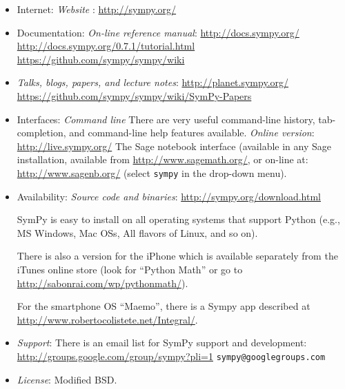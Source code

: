 \documentclass[12pt]{article}
\begin{document}
\begin{itemize}
\item
Internet:
\newline
{\it Website} :
\newline
\url{http://sympy.org/}


\item
Documentation:
\newline
{\it On-line reference manual}: 
\newline
\url{http://docs.sympy.org/}
\newline
\url{http://docs.sympy.org/0.7.1/tutorial.html}
\newline
\url{https://github.com/sympy/sympy/wiki}

\item
{\it Talks, blogs, papers, and lecture notes}:
\newline
\url{http://planet.sympy.org/}
\newline
\url{https://github.com/sympy/sympy/wiki/SymPy-Papers}

\item
Interfaces:
\newline
{\it Command line}
\newline
There are very useful command-line history, tab-completion, and
command-line help features available.
\newline
{\it Online version}:
\newline
\url{http://live.sympy.org/}
\newline
The Sage notebook interface (available in any Sage installation,
available from \url{http://www.sagemath.org/}, or on-line at:
\url{http://www.sagenb.org/} (select {\tt sympy} in the drop-down menu).
\item
Availability:
\newline
{\it Source code and binaries}:
\url{http://sympy.org/download.html}

SymPy is easy to install on all operating systems that 
support Python (e.g., MS Windows, Mac OSs, All flavors of Linux, and
so on).

There is also a version for the iPhone which is available separately
from the iTunes online store (look for ``Python Math'' or
go to \url{http://sabonrai.com/wp/pythonmath/}).

For the smartphone OS ``Maemo'', there is a Sympy app described at
\url{http://www.robertocolistete.net/Integral/}.


\item
{\it Support}:
\newline
There is an email list for SymPy support and development:
\newline
\url{http://groups.google.com/group/sympy?pli=1}
\newline
{\tt sympy@googlegroups.com}


\item
{\it License}:
\newline
Modified BSD. 

\end{itemize}
\end{document}
